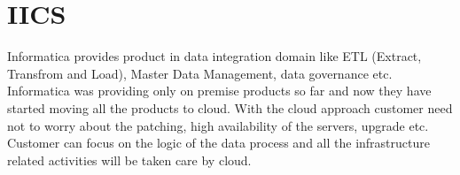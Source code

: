 \section{IICS}

Informatica provides product in data integration domain like ETL (Extract, Transfrom and Load), Master Data Management, data governance etc. Informatica was providing only on premise products so far and now they have started moving all the products to cloud. With the cloud approach customer need not to worry about the patching, high availability of the servers, upgrade etc. Customer can focus on the logic of the data process and all the infrastructure related activities will be taken care by cloud\cites{hid-sp18-511-iics}.

